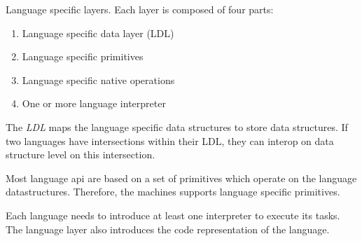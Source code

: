 \begin{paragraph}{Language specific layers.}
Each layer is composed of four parts:
\begin{enumerate}
\item Language specific data layer (LDL)
\item Language specific primitives
\item Language specific native operations
\item One or more language interpreter
\end{enumerate}
The {\em LDL} maps the language specific data structures to store data
structures. If two languages have intersections within their LDL, they
can interop on data structure level on this intersection.

Most language api are based on a set of primitives which operate
on the language datastructures.
Therefore, the machines supports language specific primitives.

Each language needs to introduce at least one interpreter to
execute its tasks. The language layer also introduces the
code representation of the language.
\end{paragraph}
